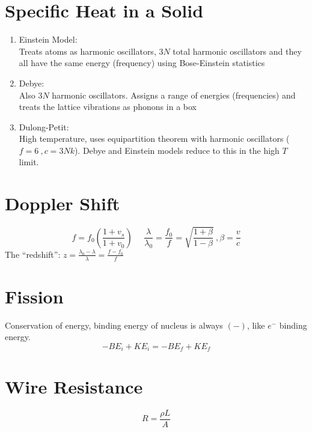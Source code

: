 \documentclass[10pt,a4paper]{article}
\begin{document}
\section{Specific Heat in a Solid} %
\label{sec:specific_heat_in_a_solid}
\begin{enumerate}
    \item Einstein Model:\\
    Treats atoms as harmonic oscillators, $3N$ total harmonic oscillators and they all have the same energy (frequency) using Bose-Einstein statistics
    \item Debye:\\
    Also $3N$ harmonic oscillators. Assigns a range of energies (frequencies) and treats the lattice vibrations as phonons in a box
    \item Dulong-Petit:\\
    High temperature, uses equipartition theorem with harmonic oscillators ($f=6~,c=3Nk$). Debye and Einstein models reduce to this in the high $T$ limit.
\end{enumerate}

\section{Doppler Shift} %
\label{sec:doppler_shift}
\begin{equation}
    f = f_0 \left( \frac{1 + v_s}{1 + v_0} \right) ~~~~~~ \frac{\lambda}{\lambda_0} = \frac{f_0}{f} = \sqrt{\frac{1 + \beta}{1 -\beta}}~, \beta = \frac{v}{c}
\end{equation}
The ``redshift'': $z = \frac{\lambda_0 - \lambda}{\lambda} = \frac{f -f_0}{f}$

\section{Fission} %
\label{sec:fission}
Conservation of energy, binding energy of nucleus is always $(-)$, like $e^-$ binding energy.
\begin{equation}
    -BE_i + KE_i = -BE_f + KE_f
\end{equation}

\section{Wire Resistance} %
\label{sec:wire_resistance}
\begin{equation}
    R = \frac{\rho L}{A}
\end{equation}
\end{document}
